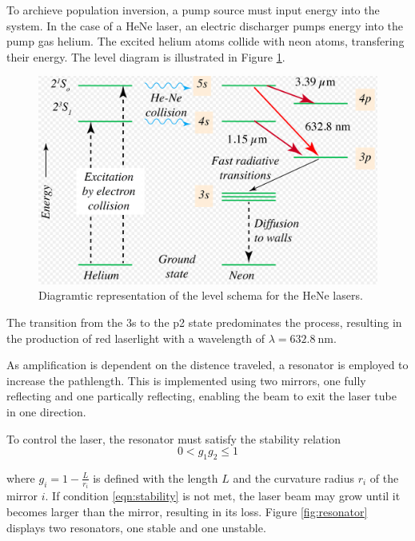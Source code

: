 To archieve population inversion, a pump source must input energy 
into the system. In the case of a HeNe laser, an electric discharger 
pumps energy into the pump gas helium. The excited helium atoms 
collide with neon atoms, transfering their energy. The level diagram is 
illustrated in Figure \ref{fig:level}.

\begin{figure}
    \centering
    \includegraphics[width=0.7\linewidth]{pictures/level.png}
    \caption{Diagramtic representation of the level schema for the HeNe lasers.}
    \label{fig:level}
\end{figure}
The transition from the 3s to the p2 state predominates the process, 
resulting in the production of red laserlight with a wavelength of 
$\lambda = \SI{632.8}{\nano\meter}$.

As amplification is dependent on the distence traveled, a resonator is 
employed to increase the pathlength. This is implemented using two 
mirrors, one fully reflecting and one partically reflecting, enabling
the beam to exit the laser tube in one direction.

To control the laser, the resonator must satisfy the stability relation
\begin{equation}
    0 < g_1g_2 \leq 1
    \label{eqn:stability}
\end{equation}

where $g_i=1-\frac{L}{r_i}$ is defined with the length $L$ and the 
curvature radius $r_i$ of the mirror $i$. If condition \eqref{eqn:stability}
is not met, the laser beam may grow until it becomes larger than the mirror,
resulting in its loss. Figure \ref{fig:resonator} displays two resonators,
one stable and one unstable. 

